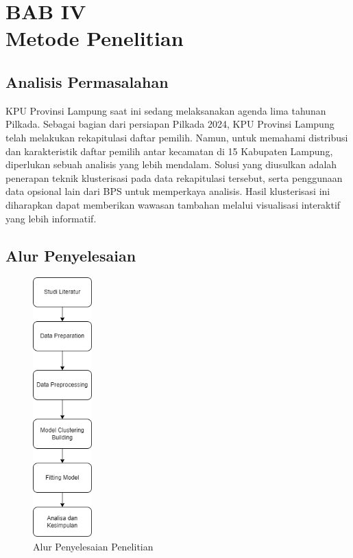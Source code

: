 \section*{\centering BAB IV \\ Metode Penelitian}


\setcounter{section}{4}
\setcounter{table}{0}
\setcounter{subsection}{0}  %
\setcounter{figure}{0}
\renewcommand{\thefigure}{\thesection.\arabic{figure}}
\renewcommand{\thetable}{\thesection.\arabic{table}}

\subsection{Analisis Permasalahan}
KPU Provinsi Lampung saat ini sedang melaksanakan agenda lima tahunan Pilkada. Sebagai bagian dari persiapan Pilkada 2024, KPU Provinsi Lampung telah melakukan rekapitulasi daftar pemilih. Namun, untuk memahami distribusi dan karakteristik daftar pemilih antar kecamatan di 15 Kabupaten Lampung, diperlukan sebuah analisis yang lebih mendalam. Solusi yang diusulkan adalah penerapan teknik klusterisasi pada data rekapitulasi tersebut, serta penggunaan data opsional lain dari BPS untuk memperkaya analisis. Hasil klusterisasi ini diharapkan dapat memberikan wawasan tambahan melalui visualisasi interaktif yang lebih informatif.

\subsection{Alur Penyelesaian}
\begin{figure}[h]
    \centering
    \includegraphics[width=0.2\linewidth, height=10cm]{images/flow.png}
    \caption{Alur Penyelesaian Penelitian}
    \label{fig:flow}
\end{figure}

